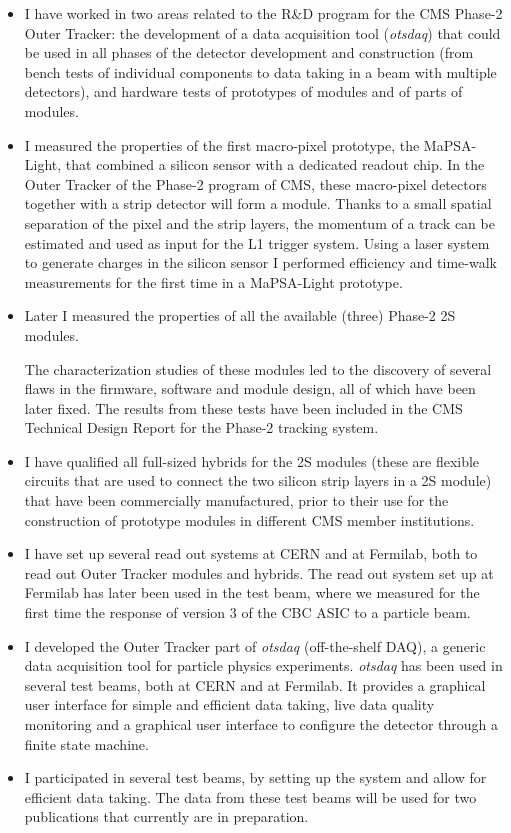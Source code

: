 \documentclass[]{cv} %
\begin{document}
\begin{resume}
\begin{itemize}
  \item I have worked in two areas related to the R\&D program for the CMS
        Phase-2 Outer Tracker: the development of a data acquisition tool
        (\textit{otsdaq}) that could be used in all phases of the detector
        development and construction (from bench tests of individual components
        to data taking in a beam with multiple detectors), and hardware tests of
        prototypes of modules and of parts of modules.
  \item I measured the properties of the first macro-pixel prototype, the
        MaPSA-Light, that combined a silicon sensor with a dedicated readout
        chip. In the Outer Tracker of the Phase-2 program of CMS, these
        macro-pixel detectors together with a strip detector will form a module.
        Thanks to a small spatial separation of the pixel and the strip layers,
        the momentum of a track can be estimated and used as input for the L1
        trigger system. Using a laser system to generate charges in the silicon
        sensor I performed efficiency and time-walk measurements for the first
        time in a MaPSA-Light prototype.
  \item Later I measured the properties of all the available (three) Phase-2 2S
        modules.

        The characterization studies of these modules led to the
        discovery of several flaws in the firmware, software and module design,
        all of which have been later fixed. The results from these tests have
        been included in the CMS Technical Design Report for the Phase-2
        tracking system.
  \item I have qualified all full-sized hybrids for the 2S modules (these are
        flexible circuits that are used to connect the two silicon strip layers
        in a 2S module) that have been commercially manufactured, prior to their
        use for the construction of prototype modules in different CMS member
        institutions.
  \item I have set up several read out systems at CERN and at Fermilab, both to
        read out Outer Tracker modules and hybrids. The read out system set up
        at Fermilab has later been used in the test beam, where we measured for
        the first time the response of version 3 of the CBC ASIC to a particle
        beam.
  \item I developed the Outer Tracker part of \textit{otsdaq} (off-the-shelf
        DAQ), a generic data acquisition tool for particle physics experiments.
        \textit{otsdaq} has been used in several test beams, both at CERN and at
        Fermilab. It provides a graphical user interface for simple and
        efficient data taking, live data quality monitoring and a graphical user
        interface to configure the detector through a finite state machine.
  \item I participated in several test beams, by setting up the system and allow
        for efficient data taking. The data from these test beams will be used
        for two publications that currently are in preparation.
\end{itemize}


\end{resume}
\end{document}
